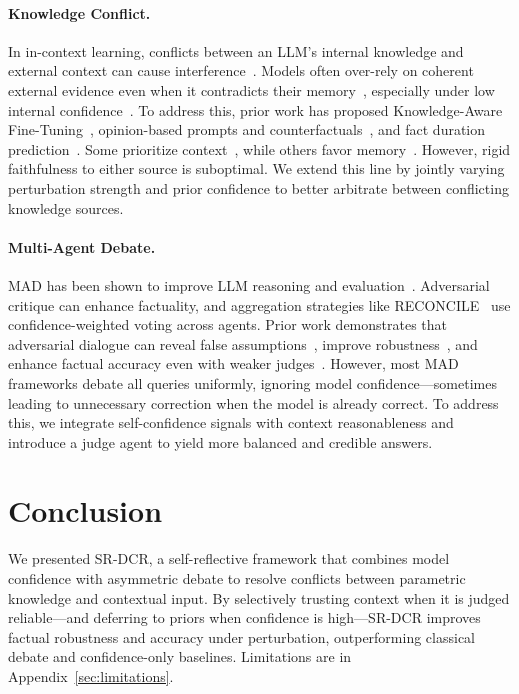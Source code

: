 \documentclass[11pt]{article}
\begin{document}
\paragraph{Knowledge Conflict.} In in-context learning, conflicts between an LLM’s internal knowledge and external context can cause interference~\citep{jin-etal-2024-tug}. Models often over-rely on coherent external evidence even when it contradicts their memory~\citep{xie2024adaptive}, especially under low internal confidence~\citep{xu-etal-2024-earth,chatziveroglou2025exploringllmreasoningcontrolled}. To address this, prior work has proposed Knowledge-Aware Fine-Tuning~\citep{li-etal-2023-large}, opinion-based prompts and counterfactuals~\citep{zhou-etal-2023-context}, and fact duration prediction~\citep{zhang-choi-2023-mitigating}. Some prioritize context~\citep{li-etal-2023-large,zhou-etal-2023-context,zhang-choi-2023-mitigating}, while others favor memory~\citep{hong-etal-2024-gullible}. However, rigid faithfulness to either source is suboptimal. We extend this line by jointly varying perturbation strength and prior confidence to better arbitrate between conflicting knowledge sources.

\paragraph{Multi-Agent Debate.} MAD has been shown to improve LLM reasoning and evaluation~\citep{khan2024debating}. Adversarial critique can enhance factuality, and aggregation strategies like RECONCILE~\citep{chen-etal-2024-reconcile} use confidence-weighted voting across agents. Prior work demonstrates that adversarial dialogue can reveal false assumptions~\citep{du2023improving}, improve robustness~\citep{michael2023debate}, and enhance factual accuracy even with weaker judges~\citep{kenton2024scalable}. However, most MAD frameworks debate all queries uniformly, ignoring model confidence—sometimes leading to unnecessary correction when the model is already correct. To address this, we integrate self-confidence signals with context reasonableness and introduce a judge agent to yield more balanced and credible answers.


\section{Conclusion}
We presented SR-DCR, a self-reflective framework that combines model confidence with asymmetric debate to resolve conflicts between parametric knowledge and contextual input. By selectively trusting context when it is judged reliable—and deferring to priors when confidence is high—SR-DCR improves factual robustness and accuracy under perturbation, outperforming classical debate and confidence-only baselines. Limitations are in Appendix~\ref{sec:limitations}. 
\end{document}
